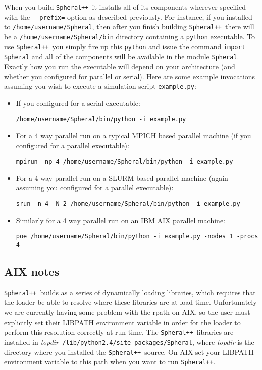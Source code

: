 \documentclass{article}
\newcommand{\Spheral}{{\tt Spheral++}}
\begin{document}
When you build \Spheral\ it installs all of its components wherever specified
with the \verb.--prefix=. option as described previously.  For instance, if you
installed to \verb+/home/username/Spheral+, then after you finish building
\Spheral\ there will be a \verb+/home/username/Spheral/bin+ directory containing
a \verb+python+ executable.  To use \Spheral\ you simply fire up this
\verb+python+ and issue the command \verb+import Spheral+ and all of the
components will be available in the module \verb+Spheral+.  Exactly how you run
the executable will depend on your architecture (and whether you configured for
parallel or serial).  Here are some example invocations assuming you wish to
execute a simulation script \verb+example.py+:
\begin{itemize}
\item If you configured for a serial executable:
\begin{verbatim}
/home/username/Spheral/bin/python -i example.py
\end{verbatim}
\item For a 4 way parallel run on a typical MPICH based parallel machine (if you
configured for a parallel executable):
\begin{verbatim}
mpirun -np 4 /home/username/Spheral/bin/python -i example.py
\end{verbatim}
\item For a 4 way parallel run on a SLURM based parallel machine (again assuming
you configured for a parallel executable):
\begin{verbatim}
srun -n 4 -N 2 /home/username/Spheral/bin/python -i example.py
\end{verbatim}
\item Similarly for a 4 way parallel run on an IBM AIX parallel machine:
\begin{verbatim}
poe /home/username/Spheral/bin/python -i example.py -nodes 1 -procs 4
\end{verbatim}
\end{itemize}

\subsection{AIX notes}
\Spheral\ builds as a series of dynamically loading libraries, which requires
that the loader be able to resolve where these libraries are at load time.
Unfortunately we are currently having some problem with the rpath on AIX, so the
user must explicitly set their LIBPATH environment variable in order for the
loader to perform this resolution correctly at run time.  The
\Spheral\ libraries are installed in {\em topdir}{\tt
  /lib/python2.4/site-packages/Spheral}, where {\em topdir} is the directory
where you installed the \Spheral\ source.  On AIX set your LIBPATH environment
variable to this path when you want to run \Spheral.
\end{document}

